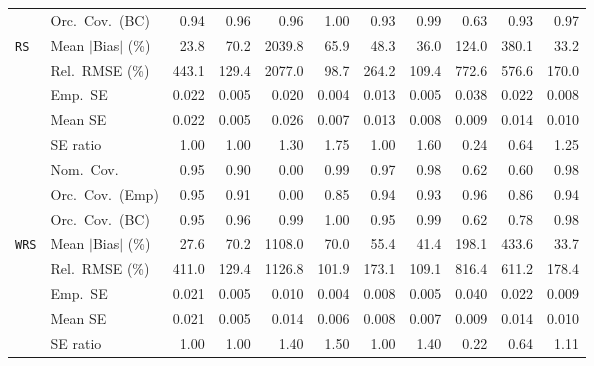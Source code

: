 \begin{landscape}
\begin{longtable}{llrrrrrrrrr}
 & Orc.\ Cov.\ (BC) & \cellcolor{rankone}0.94 & \cellcolor{rankone}0.96 & \cellcolor{rankone}0.96 & 1.00 & \cellcolor{ranktwo}0.93 & \cellcolor{rankthree}0.99 & 0.63 & \cellcolor{ranktwo}0.93 & \cellcolor{ranktwo}0.97 \\
\addlinespace[2pt]
\quad \texttt{RS} & Mean $|$Bias$|$ (\%) & \cellcolor{rankone}23.8 & 70.2 & 2039.8 & 65.9 & 48.3 & \cellcolor{rankthree}36.0 & 124.0 & 380.1 & \cellcolor{ranktwo}33.2 \\
 & Rel.\ RMSE (\%) & 443.1 & \cellcolor{rankthree}129.4 & 2077.0 & \cellcolor{rankone}98.7 & 264.2 & \cellcolor{ranktwo}109.4 & 772.6 & 576.6 & 170.0 \\
 & Emp.\ SE & 0.022 & 0.005 & 0.020 & 0.004 & 0.013 & 0.005 & 0.038 & 0.022 & 0.008 \\
 & Mean SE & 0.022 & 0.005 & 0.026 & 0.007 & 0.013 & 0.008 & 0.009 & 0.014 & 0.010 \\
 & SE ratio & \cellcolor{rankone}1.00 & \cellcolor{rankone}1.00 & \cellcolor{rankthree}1.30 & 1.75 & \cellcolor{rankone}1.00 & 1.60 & 0.24 & 0.64 & \cellcolor{ranktwo}1.25 \\
 & Nom.\ Cov. & \cellcolor{rankone}0.95 & 0.90 & 0.00 & 0.99 & \cellcolor{ranktwo}0.97 & \cellcolor{rankthree}0.98 & 0.62 & 0.60 & \cellcolor{rankthree}0.98 \\
 & Orc.\ Cov.\ (Emp) & \cellcolor{rankone}0.95 & 0.91 & 0.00 & 0.85 & \cellcolor{ranktwo}0.94 & \cellcolor{rankthree}0.93 & \cellcolor{ranktwo}0.96 & 0.86 & \cellcolor{ranktwo}0.94 \\
 & Orc.\ Cov.\ (BC) & \cellcolor{rankone}0.95 & \cellcolor{ranktwo}0.96 & 0.99 & 1.00 & \cellcolor{rankone}0.95 & 0.99 & 0.62 & 0.78 & \cellcolor{rankthree}0.98 \\
\addlinespace[2pt]
\quad \texttt{WRS} & Mean $|$Bias$|$ (\%) & \cellcolor{rankone}27.6 & 70.2 & 1108.0 & 70.0 & 55.4 & \cellcolor{rankthree}41.4 & 198.1 & 433.6 & \cellcolor{ranktwo}33.7 \\
 & Rel.\ RMSE (\%) & 411.0 & \cellcolor{rankthree}129.4 & 1126.8 & \cellcolor{rankone}101.9 & 173.1 & \cellcolor{ranktwo}109.1 & 816.4 & 611.2 & 178.4 \\
 & Emp.\ SE & 0.021 & 0.005 & 0.010 & 0.004 & 0.008 & 0.005 & 0.040 & 0.022 & 0.009 \\
 & Mean SE & 0.021 & 0.005 & 0.014 & 0.006 & 0.008 & 0.007 & 0.009 & 0.014 & 0.010 \\
 & SE ratio & \cellcolor{rankone}1.00 & \cellcolor{rankone}1.00 & 1.40 & 1.50 & \cellcolor{rankone}1.00 & 1.40 & 0.22 & \cellcolor{rankthree}0.64 & \cellcolor{ranktwo}1.11 \\

\end{longtable}
\end{landscape}
